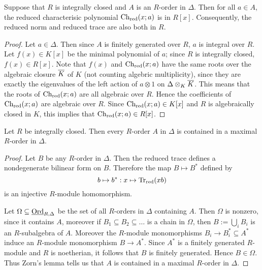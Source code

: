 \begin{lem}
Suppose that $R$ is integrally closed and $A$ is an $R$-order in $\Delta$.  Then for all $a\in A$, the reduced characterisic polynomial $\textnormal{Ch}_{\text{red}}(x;a)$ is in $R[x]$.  Consequently, the reduced norm and reduced trace are also both in $R$.
\end{lem}
\begin{proof}
Let $a\in \Delta$.  Then since $A$ is finitely generated over $R$, $a$ is integral over $R$.  Let $f(x)\in K[x]$ be the minimal polynomial of $a$; since $R$ is integrally closed, $f(x)\in R[x]$.  Note that $f(x)$ and $\textnormal{Ch}_{\text{red}}(x;a)$ have the same roots over the algebraic closure $\overline{K}$ of $K$ (not counting algebric multiplicity), since they are exactly the eigenvalues of the left action of $a\otimes 1$ on $\Delta\otimes_K\overline{K}$.  This means that the roots of $\textnormal{Ch}_{\text{red}}(x;a)$ are all algebraic over $R$.  Hence the coefficients of $\textnormal{Ch}_{\text{red}}(x;a)$ are algebraic over $R$.  Since $\textnormal{Ch}_{\text{red}}(x;a)\in K[x]$ and $R$ is algebraically closed in $K$, this implies that $\textnormal{Ch}_{\text{red}}(x;a)\in R[x]$.
\end{proof}

\begin{prop}
Let $R$ be integrally closed.  Then every $R$-order $A$ in $\Delta$ is contained in a maximal $R$-order in $\Delta$.
\end{prop}
\begin{proof}
Let $B$ be any $R$-order in $\Delta$.  Then the reduced trace defines a nondegenerate bilinear form on $B$.  Therefore the map $B\mapsto B^*$ defined by
$$b\mapsto b^*: x\mapsto \textnormal{Tr}_{\text{red}}(xb)$$
is an injective $R$-module homomorphism.

Let $\Omega\subseteq\textnormal{\underline{Ord}}_{R,\Delta}$ be the set of all $R$-orders in $\Delta$ containing $A$.  Then $\Omega$ is nonzero, since it contains $A$, moreover if $B_1\subseteq B_2\subseteq \dots$ is a chain in $\Omega$, then $B:=\bigcup_i B_i$ is an $R$-subalgebra of $A$.  Moreover the $R$-module monomorphisms $B_i\rightarrow B_i^*\subseteq A^*$ induce an $R$-module monomorphism $B\rightarrow A^*$.  Since $A^*$ is a finitely generated $R$-module and $R$ is noetherian, it follows that $B$ is finitely generated.  Hence $B\in \Omega$.  Thus Zorn's lemma tells us that $A$ is contained in a maximal $R$-order in $\Delta$.
\end{proof}

